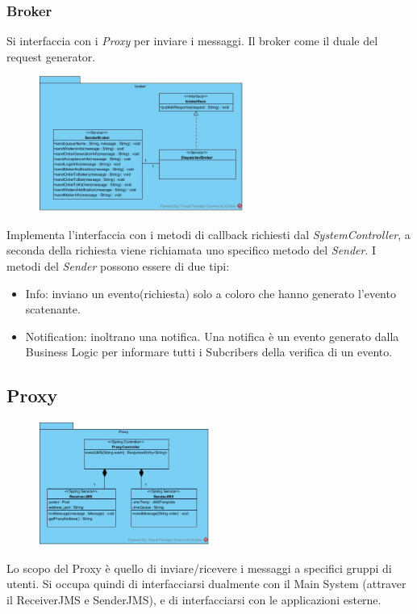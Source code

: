 \subsubsection{Broker}
Si interfaccia con i \textit{Proxy} per inviare i messaggi. Il broker come il duale del request generator.
\begin{figure}[H]
	\centering
	\includegraphics[width=0.6\textwidth]{Immagini/broker.jpg}
\end{figure}
Implementa l'interfaccia con i metodi di callback richiesti dal \textit{SystemController}, a seconda della richiesta viene richiamata uno specifico metodo del \textit{Sender}.
I metodi del \textit{Sender} possono essere di due tipi:
\begin{itemize}
	\item Info: inviano un evento(richiesta) solo a coloro che hanno generato l'evento scatenante.
	\item Notification: inoltrano una notifica. Una notifica è un evento generato dalla Business Logic per informare tutti i Subcribers della verifica di un evento.
\end{itemize}

\subsection{Proxy}
 \begin{figure}[H]
	\centering
	\includegraphics[width=0.5\textwidth]{Immagini/proxy_classdiagram.jpg}
\end{figure}
Lo scopo del Proxy è quello di inviare/ricevere i messaggi a specifici gruppi di utenti. Si occupa quindi di interfacciarsi dualmente con il Main System (attraver il ReceiverJMS e SenderJMS), e di interfacciarsi con le applicazioni esterne.


